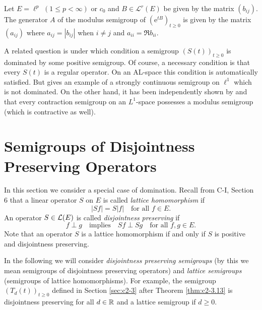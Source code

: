 \begin{example}\label{ex:c2-4.19}
Let $E = \ell^{p}$ $(1 \leq p < \infty)$ or $c_{0}$ and $B \in \mathcal{L}^{r}(E)$ be
given by the matrix $(b_{ij})$.
The generator $A$ of the modulus semigroup of $(\mathrm{e}^{tB})_{t \geq 0}$ is given by the matrix $(a_{ij})$ where $a_{ij} = |b_{ij}|$ when $i \neq j$ and $a_{ii} = \Re  b_{ii}$.
\end{example}

A related question is under which condition a semigroup $(S(t))_{t \geq 0}$ is
dominated by some positive semigroup.
Of course, a necessary condition is that every $S(t)$ is a regular operator.
On an AL-space this condition is automatically satisfied.
But \citet{kipnis:1974} gives an example of a strongly continuous semigroup on $\ell^{1}$ which is not dominated.
On the other hand, it has been independently shown by \citet{kipnis:1974} and
\citet{kubokawa:1975} that every contraction semigroup on an $L^{1}$-space
possesses a modulus semigroup (which is contractive as well).
\section{Semigroups of Disjointness Preserving Operators} \label{sec:c2-5}%
In this section we consider a special case of domination. 
Recall from C-I, Section 6 
that a linear operator $S$ on $E$ is called \emph{lattice homomorphism} if
\begin{equation}\label{eq:c2-5.1}
|Sf| = S|f| \quad \text{for all } f \in E.
\end{equation}
An operator $S \in \mathcal{L}(E)$ is called \emph{disjointness preserving} if
\begin{equation}\label{eq:c2-5.2}
f \perp g \quad \text{implies} \quad Sf \perp Sg \quad \text{for all } f,g \in E.
\end{equation}
Note that an operator $S$ is a lattice homomorphism if and only if $S$
is positive and disjointness preserving.

In the following we will consider \emph{disjointness preserving semigroups}
(by this we mean semigroups of disjointness preserving operators) and
\emph{lattice semigroups} (\ie semigroups of lattice homomorphisms). For
example, the semigroup $(T_{d}(t))_{t \geq 0}$ defined in Section \ref{sec:c2-3} after Theorem \ref{thm:c2-3.13}  is disjointness preserving for all $d \in \mathbb{R}$ and a lattice semigroup if $d \geq 0$.


